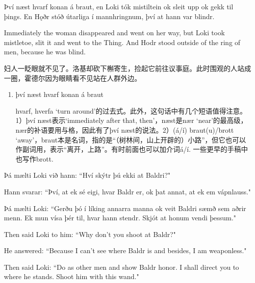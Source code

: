 \begin{paracol}{2}
    Því næst hvarf konan á braut, en Loki tók mistiltein ok sleit upp ok gekk til þings. En Hǫðr stóð útarliga í mann\-hringnum, því at hann var blindr.

    \switchcolumn

    Immediately the woman disappeared and went on her way, but Loki took mistletoe, slit it and went to the Thing. And Hodr stood outside of the ring of men, because he was blind.
\end{paracol}
\begin{translation*}{}
    妇人一眨眼就不见了。洛基却砍下槲寄生，捡起它前往议事庭。此时围观的人站成一圈，霍德尔因为眼睛看不见站在人群外边。
\end{translation*}
\begin{grammar*}{}
    \begin{enumerate}[leftmargin=*]
        \item því næst hvarf konan á braut

              hvarf, hverfa `turn around'的过去式。此外，这句话中有几个短语值得注意。1）því næst表示`immediately after that, then'，næst是nær `near'的最高级，nær的补语要用与格，因此有了því næst的说法。2）(á/í) braut(u)/brott `away'，braut本是名词，指的是“（树林间，山上开辟的）小路”，但它也可以作副词用，表示“离开，上路”。有时前面也可以加介词á/í. 一些更早的手稿中也写作brott.
    \end{enumerate}
\end{grammar*}
\begin{paracol}{2}
    Þá mælti Loki við hann: ``Hví skýtr þú ekki at Baldri?"

    Hann svarar: ``Því, at ek sé eigi, hvar Baldr er, ok þat annat, at ek em vápnlauss."

    Þá mælti Loki: ``Gerðu þó í líking annarra manna ok veit Baldri sæmð sem aðrir menn. Ek mun vísa þér til, hvar hann stendr. Skjót at honum vendi þessum."\\

    \switchcolumn

    Then said Loki to him: ``Why don't you shoot at Baldr?"

    He answered: ``Because I can't see where Baldr is and besides, I am weaponless."

    Then said Loki: ``Do as other men and show Baldr honor. I shall direct you to where he stands. Shoot him with this wand."
\end{paracol}

